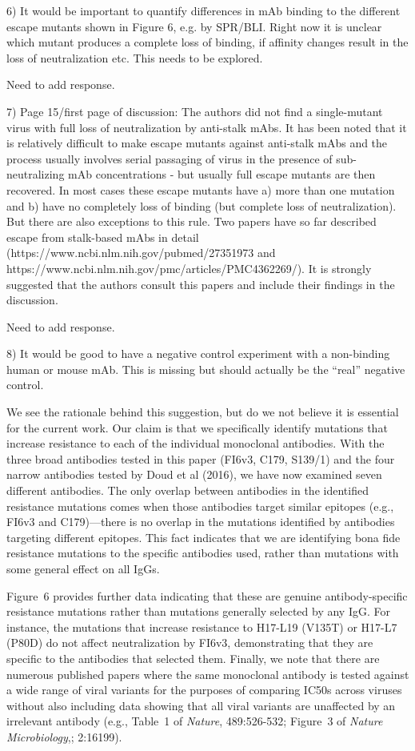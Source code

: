 \documentclass[11pt, oneside]{article}   	%
\begin{document}
6) It would be important to quantify differences in mAb binding to the different escape mutants shown in Figure 6, e.g. by SPR/BLI. Right now it is unclear which mutant produces a complete loss of binding, if affinity changes result in the loss of neutralization etc. This needs to be explored.

{\color{red}
Need to add response.}

7) Page 15/first page of discussion: The authors did not find a single-mutant virus with full loss of neutralization by anti-stalk mAbs. It has been noted that it is relatively difficult to make escape mutants against anti-stalk mAbs and the process usually involves serial passaging of virus in the presence of sub-neutralizing mAb concentrations - but usually full escape mutants are then recovered. In most cases these escape mutants have a) more than one mutation and b) have no completely loss of binding (but complete loss of neutralization). But there are also exceptions to this rule. Two papers have so far described escape from stalk-based mAbs in detail (https://www.ncbi.nlm.nih.gov/pubmed/27351973 and https://www.ncbi.nlm.nih.gov/pmc/articles/PMC4362269/). It is strongly suggested that the authors consult this papers and include their findings in the discussion.

{\color{red}
Need to add response.}

8) It would be good to have a negative control experiment with a non-binding human or mouse mAb. This is missing but should actually be the ``real'' negative control.

{\color{black}
We see the rationale behind this suggestion, but do we not believe it is essential for the current work. 
Our claim is that we specifically identify mutations that increase resistance to each of the individual monoclonal antibodies.
With the three broad antibodies tested in this paper (FI6v3, C179, S139/1) and the four narrow antibodies tested by Doud et al (2016), we have now examined seven different antibodies.
The only overlap between antibodies in the identified resistance mutations comes when those antibodies target similar epitopes (e.g., FI6v3 and C179)---there is no overlap in the mutations identified by antibodies targeting different epitopes.
This fact indicates that we are identifying bona fide resistance mutations to the specific antibodies used, rather than mutations with some general effect on all IgGs.

Figure~6 provides further data indicating that these are genuine antibody-specific resistance mutations rather than mutations generally selected by any IgG.
For instance, the mutations that increase resistance to H17-L19 (V135T) or H17-L7 (P80D) do not affect neutralization by FI6v3, demonstrating that they are specific to the antibodies that selected them.
Finally, we note that there are numerous published papers where the same monoclonal antibody is tested against a wide range of viral variants for the purposes of comparing IC50s across viruses without also including data showing that all viral variants are unaffected by an irrelevant antibody (e.g., Table~1 of \textit{Nature}, 489:526-532; Figure~3 of \textit{Nature Microbiology},; 2:16199).
}
\end{document}
